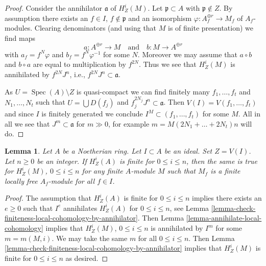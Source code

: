\documentclass{stacks-project}
\theoremstyle{plain}
\newtheorem{lemma}[subsection]{Lemma}
\theoremstyle{definition}
\theoremstyle{remark}
\numberwithin{equation}{subsection}
\def\Spec{\mathop{\mathrm{Spec}}}
\begin{document}
\begin{proof}
Consider the annihilator $\mathfrak a$ of $H^i_Z(M)$.
Let $\mathfrak p \subset A$ with $\mathfrak p \not \in Z$.
By assumption there exists an $f \in I$, $f \not \in \mathfrak p$
and an isomorphism $\varphi : A_f^{\oplus r} \to M_f$
of $A_f$-modules. Clearing denominators (and using that
$M$ is of finite presentation) we find maps
$$
a : A^{\oplus r} \longrightarrow M
\quad\text{and}\quad
b : M \longrightarrow A^{\oplus r}
$$
with $a_f = f^N \varphi$ and $b_f = f^N \varphi^{-1}$ for some $N$.
Moreover we may assume that $a \circ b$ and $b \circ a$ are equal to
multiplication by $f^{2N}$. Thus we see that $H^i_Z(M)$ is annihilated by
$f^{2N}J^n$, i.e., $f^{2N}J^n \subset \mathfrak a$.

\medskip\noindent
As $U = \Spec(A) \setminus Z$ is quasi-compact we can find finitely many
$f_1, \ldots, f_t$ and $N_1, \ldots, N_t$ such that $U = \bigcup D(f_j)$ and
$f_j^{2N_j}J^n \subset \mathfrak a$. Then $V(I) = V(f_1, \ldots, f_t)$
and since $I$ is finitely generated we conclude
$I^M \subset (f_1, \ldots, f_t)$ for some $M$.
All in all we see that $J^m \subset \mathfrak a$ for
$m \gg 0$, for example $m = M (2N_1 + \ldots + 2N_t) n$ will do.
\end{proof}

\begin{lemma}
\label{lemma-local-finiteness-for-finite-locally-free}
Let $A$ be a Noetherian ring. Let $I \subset A$ be an ideal. Set $Z = V(I)$.
Let $n \geq 0$ be an integer. If $H^i_Z(A)$ is finite for $0 \leq i \leq n$,
then the same is true for $H^i_Z(M)$, $0 \leq i \leq n$ for
any finite $A$-module $M$ such that $M_f$ is a finite locally free
$A_f$-module for all $f \in I$.
\end{lemma}

\begin{proof}
The assumption that $H^i_Z(A)$ is finite for $0 \leq i \leq n$
implies there exists an $e \geq 0$ such that $I^e$ annihilates
$H^i_Z(A)$ for $0 \leq i \leq n$, see
Lemma \ref{lemma-check-finiteness-local-cohomology-by-annihilator}.
Then Lemma \ref{lemma-annihilate-local-cohomology}
implies that $H^i_Z(M)$, $0 \leq i \leq n$ is annihilated
by $I^m$ for some $m = m(M, i)$. We may take the same $m$
for all $0 \leq i \leq n$. Then
Lemma \ref{lemma-check-finiteness-local-cohomology-by-annihilator}
implies that $H^i_Z(M)$ is finite for $0 \leq i \leq n$
as desired.
\end{proof}
\end{document}
